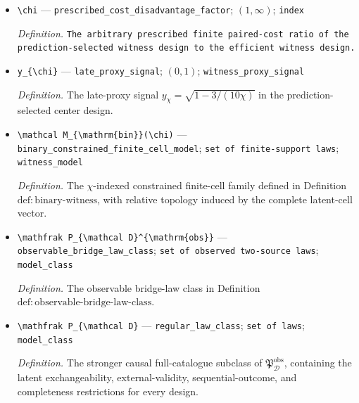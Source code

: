 \documentclass{article}
\begin{document}
\begin{itemize}
  \item \texttt{\textbackslash{}\allowbreak{}chi} --- \texttt{prescribed\_\allowbreak{}cost\_\allowbreak{}disadvantage\_\allowbreak{}factor}; \((1,\infty)\); \texttt{index}
  \par\smallskip\noindent\emph{Definition.} \texttt{The arbitrary prescribed finite paired-\allowbreak{}cost ratio of the prediction-\allowbreak{}selected witness design to the efficient witness design.}
  \item \texttt{y\_\allowbreak{}\{\textbackslash{}\allowbreak{}chi\}\allowbreak{}} --- \texttt{late\_\allowbreak{}proxy\_\allowbreak{}signal}; \((0,1)\); \texttt{witness\_\allowbreak{}proxy\_\allowbreak{}signal}
  \par\smallskip\noindent\emph{Definition.} The late-proxy signal \(y_{\chi}=\sqrt{1-3/(10\chi)}\) in the prediction-selected center design.
  \item \texttt{\textbackslash{}\allowbreak{}mathcal M\_\allowbreak{}\{\textbackslash{}\allowbreak{}mathrm\{bin\}\allowbreak{}\}\allowbreak{}(\textbackslash{}\allowbreak{}chi)} --- \texttt{binary\_\allowbreak{}constrained\_\allowbreak{}finite\_\allowbreak{}cell\_\allowbreak{}model}; \texttt{set of finite-\allowbreak{}support laws}; \texttt{witness\_\allowbreak{}model}
  \par\smallskip\noindent\emph{Definition.} The \(\chi\)-indexed constrained finite-cell family defined in Definition \(\mathrm{def{:}binary\text{-}witness}\), with relative topology induced by the complete latent-cell vector.
  \item \texttt{\textbackslash{}\allowbreak{}mathfrak P\_\allowbreak{}\{\textbackslash{}\allowbreak{}mathcal D\}\allowbreak{}\textasciicircum{}\{\textbackslash{}\allowbreak{}mathrm\{obs\}\allowbreak{}\}\allowbreak{}} --- \texttt{observable\_\allowbreak{}bridge\_\allowbreak{}law\_\allowbreak{}class}; \texttt{set of observed two-\allowbreak{}source laws}; \texttt{model\_\allowbreak{}class}
  \par\smallskip\noindent\emph{Definition.} The observable bridge-law class in Definition \(\mathrm{def{:}observable\text{-}bridge\text{-}law\text{-}class}\).
  \item \texttt{\textbackslash{}\allowbreak{}mathfrak P\_\allowbreak{}\{\textbackslash{}\allowbreak{}mathcal D\}\allowbreak{}} --- \texttt{regular\_\allowbreak{}law\_\allowbreak{}class}; \texttt{set of laws}; \texttt{model\_\allowbreak{}class}
  \par\smallskip\noindent\emph{Definition.} The stronger causal full-catalogue subclass of \(\mathfrak P_{\mathcal D}^{\mathrm{obs}}\), containing the latent exchangeability, external-validity, sequential-outcome, and completeness restrictions for every design.

\end{itemize}
\end{document}
